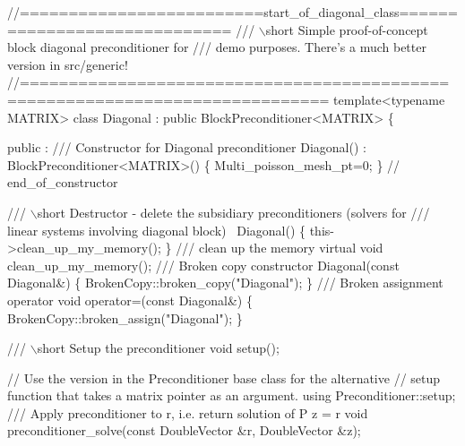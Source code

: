  
\begin{DoxyCodeInclude}
\textcolor{comment}{//=========================start\_of\_diagonal\_class=============================}
\textcolor{comment}{/// \(\backslash\)short Simple proof-of-concept block diagonal preconditioner for}
\textcolor{comment}{}\textcolor{comment}{/// demo purposes. There's a much better version in src/generic!}
\textcolor{comment}{}\textcolor{comment}{//=============================================================================}
 \textcolor{keyword}{template}<\textcolor{keyword}{typename} MATRIX> 
 \textcolor{keyword}{class }Diagonal : \textcolor{keyword}{public} BlockPreconditioner<MATRIX>
 \{
  
 public :
  \textcolor{comment}{}
\textcolor{comment}{  /// Constructor for Diagonal preconditioner}
\textcolor{comment}{}  Diagonal() : BlockPreconditioner<MATRIX>()
   \{
    Multi\_poisson\_mesh\_pt=0;
   \} \textcolor{comment}{// end\_of\_constructor}

 \textcolor{comment}{}
\textcolor{comment}{  /// \(\backslash\)short Destructor - delete the subsidiary preconditioners (solvers for}
\textcolor{comment}{  /// linear systems involving diagonal block)}
\textcolor{comment}{}  ~Diagonal()
   \{
    this->clean\_up\_my\_memory();
   \}
  \textcolor{comment}{}
\textcolor{comment}{  /// clean up the memory}
\textcolor{comment}{}  \textcolor{keyword}{virtual} \textcolor{keywordtype}{void} clean\_up\_my\_memory();
     \textcolor{comment}{}
\textcolor{comment}{  /// Broken copy constructor}
\textcolor{comment}{}  Diagonal(\textcolor{keyword}{const} Diagonal&) 
   \{ 
    BrokenCopy::broken\_copy(\textcolor{stringliteral}{"Diagonal"});
   \} 
 \textcolor{comment}{}
\textcolor{comment}{  /// Broken assignment operator}
\textcolor{comment}{}  \textcolor{keywordtype}{void} operator=(\textcolor{keyword}{const} Diagonal&) 
   \{
    BrokenCopy::broken\_assign(\textcolor{stringliteral}{"Diagonal"});
   \}

\textcolor{comment}{}
\textcolor{comment}{  /// \(\backslash\)short Setup the preconditioner }
\textcolor{comment}{}  \textcolor{keywordtype}{void} setup();
  
  \textcolor{comment}{// Use the version in the Preconditioner base class for the alternative}
  \textcolor{comment}{// setup function that takes a matrix pointer as an argument.}
  \textcolor{keyword}{using} Preconditioner::setup;
\textcolor{comment}{}
\textcolor{comment}{  /// Apply preconditioner to r, i.e. return solution of P z = r}
\textcolor{comment}{}  \textcolor{keywordtype}{void} preconditioner\_solve(\textcolor{keyword}{const} DoubleVector &r, DoubleVector &z);


\end{DoxyCodeInclude}
